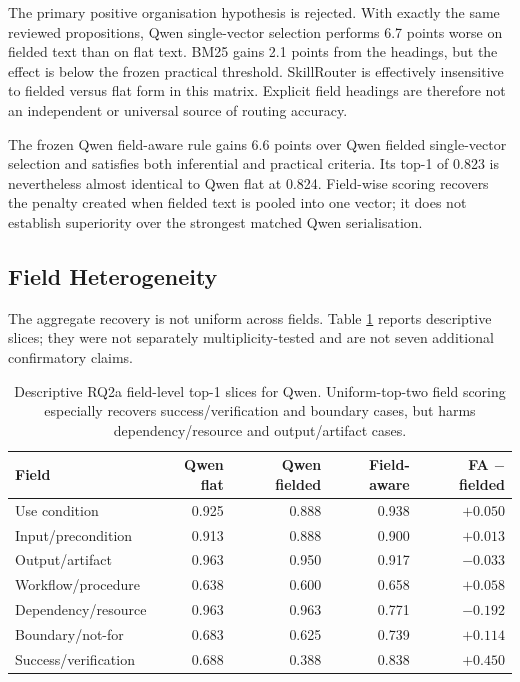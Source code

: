 The primary positive organisation hypothesis is rejected. With exactly the same reviewed propositions, Qwen single-vector selection performs 6.7 points worse on fielded text than on flat text. BM25 gains 2.1 points from the headings, but the effect is below the frozen practical threshold. SkillRouter is effectively insensitive to fielded versus flat form in this matrix. Explicit field headings are therefore not an independent or universal source of routing accuracy.

The frozen Qwen field-aware rule gains 6.6 points over Qwen fielded single-vector selection and satisfies both inferential and practical criteria. Its top-1 of 0.823 is nevertheless almost identical to Qwen flat at 0.824. Field-wise scoring recovers the penalty created when fielded text is pooled into one vector; it does not establish superiority over the strongest matched Qwen serialisation.

\subsection{Field Heterogeneity}

The aggregate recovery is not uniform across fields. Table \ref{tab:rq2a-field-slices} reports descriptive slices; they were not separately multiplicity-tested and are not seven additional confirmatory claims.

\begin{table}[H]
\centering
\scriptsize
\setlength{\tabcolsep}{3pt}
\begin{tabular}{p{}rrrr}
\toprule
Field & Qwen flat & Qwen fielded & Field-aware & FA $-$ fielded \\
\midrule
Use condition & 0.925 & 0.888 & 0.938 & $+0.050$ \\
Input/precondition & 0.913 & 0.888 & 0.900 & $+0.013$ \\
Output/artifact & 0.963 & 0.950 & 0.917 & $-0.033$ \\
Workflow/procedure & 0.638 & 0.600 & 0.658 & $+0.058$ \\
Dependency/resource & 0.963 & 0.963 & 0.771 & $-0.192$ \\
Boundary/not-for & 0.683 & 0.625 & 0.739 & $+0.114$ \\
Success/verification & 0.688 & 0.388 & 0.838 & $+0.450$ \\
\bottomrule
\end{tabular}
\caption{Descriptive RQ2a field-level top-1 slices for Qwen. Uniform-top-two field scoring especially recovers success/verification and boundary cases, but harms dependency/resource and output/artifact cases.}
\label{tab:rq2a-field-slices}
\end{table}

